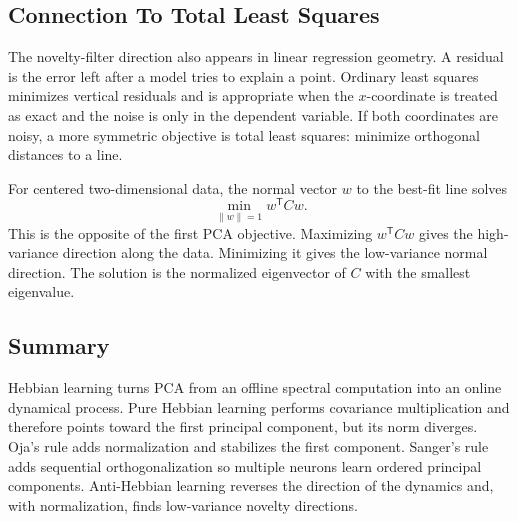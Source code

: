 \subsection{Connection To Total Least Squares}

The novelty-filter direction also appears in linear regression geometry. A residual is the error left after a model tries to explain a point. Ordinary least squares minimizes vertical residuals and is appropriate when the \(x\)-coordinate is treated as exact and the noise is only in the dependent variable. If both coordinates are noisy, a more symmetric objective is total least squares: minimize orthogonal distances to a line.

For centered two-dimensional data, the normal vector \(w\) to the best-fit line solves
\[
  \min_{\|w\|=1}
  w^{\mathsf{T}}Cw.
\]
This is the opposite of the first PCA objective. Maximizing \(w^{\mathsf{T}}Cw\) gives the high-variance direction along the data. Minimizing it gives the low-variance normal direction. The solution is the normalized eigenvector of \(C\) with the smallest eigenvalue.

\subsection{Summary}

Hebbian learning turns PCA from an offline spectral computation into an online dynamical process. Pure Hebbian learning performs covariance multiplication and therefore points toward the first principal component, but its norm diverges. Oja's rule adds normalization and stabilizes the first component. Sanger's rule adds sequential orthogonalization so multiple neurons learn ordered principal components. Anti-Hebbian learning reverses the direction of the dynamics and, with normalization, finds low-variance novelty directions.

